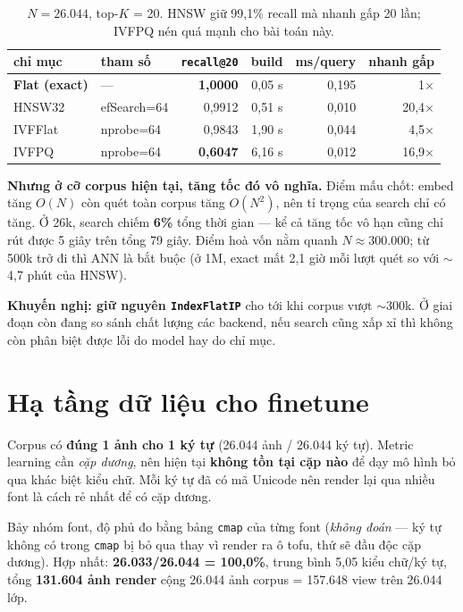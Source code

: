 \documentclass[11pt,a4paper]{article}
\newcommand{\code}[1]{\texttt{#1}}
\begin{document}
\begin{table}[h]
\centering
\begin{tabular}{llrrrr}
\toprule
chỉ mục & tham số & \code{recall@20} & build & ms/query & nhanh gấp \\
\midrule
\textbf{Flat (exact)} & --- & \textbf{1,0000} & 0,05 s & 0,195 & 1$\times$ \\
HNSW32 & efSearch=64 & 0,9912 & 0,51 s & 0,010 & 20,4$\times$ \\
IVFFlat & nprobe=64 & 0,9843 & 1,90 s & 0,044 & 4,5$\times$ \\
IVFPQ & nprobe=64 & \textbf{0,6047} & 6,16 s & 0,012 & 16,9$\times$ \\
\bottomrule
\end{tabular}
\caption{$N = 26.044$, top-$K$ = 20. HNSW giữ 99,1\% recall mà nhanh gấp 20 lần; IVFPQ nén quá mạnh
cho bài toán này.}
\end{table}

\textbf{Nhưng ở cỡ corpus hiện tại, tăng tốc đó vô nghĩa.} Điểm mấu chốt: embed tăng $O(N)$ còn quét
toàn corpus tăng $O(N^2)$, nên tỉ trọng của search chỉ có tăng. Ở 26k, search chiếm \textbf{6\%}
tổng thời gian --- kể cả tăng tốc vô hạn cũng chỉ rút được 5 giây trên tổng 79 giây. Điểm hoà vốn
nằm quanh $N \approx 300.000$; từ 500k trở đi thì ANN là bắt buộc (ở 1M, exact mất 2,1 giờ mỗi lượt
quét so với $\sim$4,7 phút của HNSW).

\textbf{Khuyến nghị: giữ nguyên \code{IndexFlatIP}} cho tới khi corpus vượt $\sim$300k. Ở giai đoạn
còn đang so sánh chất lượng các backend, nếu search cũng xấp xỉ thì không còn phân biệt được lỗi do
model hay do chỉ mục.

\section{Hạ tầng dữ liệu cho finetune}

Corpus có \textbf{đúng 1 ảnh cho 1 ký tự} (26.044 ảnh / 26.044 ký tự). Metric learning cần
\emph{cặp dương}, nên hiện tại \textbf{không tồn tại cặp nào} để dạy mô hình bỏ qua khác biệt kiểu
chữ. Mỗi ký tự đã có mã Unicode nên render lại qua nhiều font là cách rẻ nhất để có cặp dương.

Bảy nhóm font, độ phủ đo bằng bảng \code{cmap} của từng font (\emph{không đoán} --- ký tự không có
trong \code{cmap} bị bỏ qua thay vì render ra ô tofu, thứ sẽ đầu độc cặp dương). Hợp nhất:
\textbf{26.033/26.044 = 100,0\%}, trung bình 5,05 kiểu chữ/ký tự, tổng \textbf{131.604 ảnh render}
cộng 26.044 ảnh corpus = 157.648 view trên 26.044 lớp.
\end{document}
